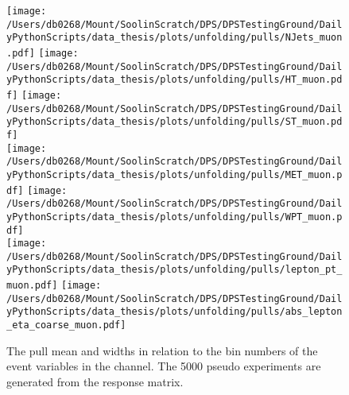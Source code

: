 \begin{figure*}[hp]
	\centering
	\texttt{[image: /Users/db0268/Mount/SoolinScratch/DPS/DPSTestingGround/DailyPythonScripts/data\_thesis/plots/unfolding/pulls/NJets\_muon.pdf]} 
	\texttt{[image: /Users/db0268/Mount/SoolinScratch/DPS/DPSTestingGround/DailyPythonScripts/data\_thesis/plots/unfolding/pulls/HT\_muon.pdf]} 
	\texttt{[image: /Users/db0268/Mount/SoolinScratch/DPS/DPSTestingGround/DailyPythonScripts/data\_thesis/plots/unfolding/pulls/ST\_muon.pdf]} \\
	\texttt{[image: /Users/db0268/Mount/SoolinScratch/DPS/DPSTestingGround/DailyPythonScripts/data\_thesis/plots/unfolding/pulls/MET\_muon.pdf]} 
	\texttt{[image: /Users/db0268/Mount/SoolinScratch/DPS/DPSTestingGround/DailyPythonScripts/data\_thesis/plots/unfolding/pulls/WPT\_muon.pdf]} \\
	\texttt{[image: /Users/db0268/Mount/SoolinScratch/DPS/DPSTestingGround/DailyPythonScripts/data\_thesis/plots/unfolding/pulls/lepton\_pt\_muon.pdf]} 
	\texttt{[image: /Users/db0268/Mount/SoolinScratch/DPS/DPSTestingGround/DailyPythonScripts/data\_thesis/plots/unfolding/pulls/abs\_lepton\_eta\_coarse\_muon.pdf]} 
	\caption[The pull mean and widths in relation to the bin numbers of the event variables in the \muJets{} channel. The 5000 pseudo experiments are generated from the \powhegpythia{} response matrix.]{The pull mean and widths in relation to the bin numbers of the event variables in the \muJets{} channel. The 5000 pseudo experiments are generated from the \powhegpythia{} response matrix.}
	\label{fig:Pullsmu}
\end{figure*}
